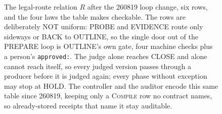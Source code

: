 \begin{figure}[t]
  \begin{minipage}{\linewidth}
    
  \end{minipage}
  \caption{The legal-route relation $R$ after the 260819 loop change, six rows,
  and the four laws the table makes checkable. The rows are deliberately NOT
  uniform: PROBE and EVIDENCE route only sideways or BACK to OUTLINE, so the
  single door out of the PREPARE loop is OUTLINE's own gate, four machine checks
  plus a person's \texttt{approved:}. The judge alone reaches CLOSE and alone
  cannot reach itself, so every judged version passes through a producer before
  it is judged again; every phase without exception may stop at HOLD. The
  controller and the auditor encode this same table since 260819, keeping only
  a \textsc{Compile} row no contract names, so already-stored receipts that
  name it stay auditable.}
  \label{fig:qpw1-route-relation}
\end{figure}
